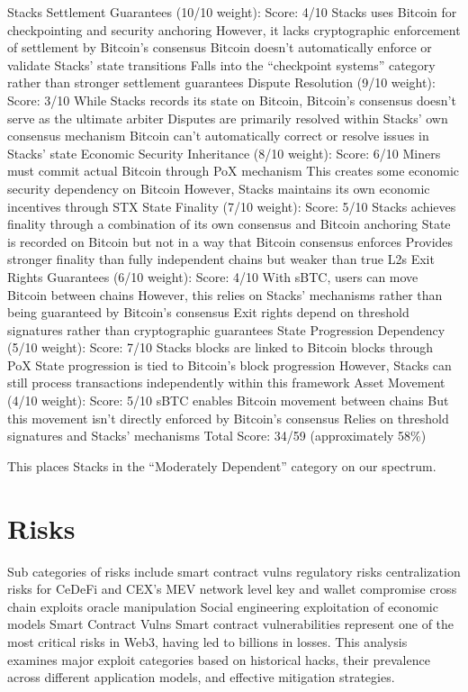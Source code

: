 \documentclass[
  letterpaper,
  DIV=11,
  numbers=noendperiod]{scrreprt}
\begin{document}
Stacks Settlement Guarantees (10/10 weight): Score: 4/10 Stacks uses
Bitcoin for checkpointing and security anchoring However, it lacks
cryptographic enforcement of settlement by Bitcoin's consensus Bitcoin
doesn't automatically enforce or validate Stacks' state transitions
Falls into the ``checkpoint systems'' category rather than stronger
settlement guarantees Dispute Resolution (9/10 weight): Score: 3/10
While Stacks records its state on Bitcoin, Bitcoin's consensus doesn't
serve as the ultimate arbiter Disputes are primarily resolved within
Stacks' own consensus mechanism Bitcoin can't automatically correct or
resolve issues in Stacks' state Economic Security Inheritance (8/10
weight): Score: 6/10 Miners must commit actual Bitcoin through PoX
mechanism This creates some economic security dependency on Bitcoin
However, Stacks maintains its own economic incentives through STX State
Finality (7/10 weight): Score: 5/10 Stacks achieves finality through a
combination of its own consensus and Bitcoin anchoring State is recorded
on Bitcoin but not in a way that Bitcoin consensus enforces Provides
stronger finality than fully independent chains but weaker than true L2s
Exit Rights Guarantees (6/10 weight): Score: 4/10 With sBTC, users can
move Bitcoin between chains However, this relies on Stacks' mechanisms
rather than being guaranteed by Bitcoin's consensus Exit rights depend
on threshold signatures rather than cryptographic guarantees State
Progression Dependency (5/10 weight): Score: 7/10 Stacks blocks are
linked to Bitcoin blocks through PoX State progression is tied to
Bitcoin's block progression However, Stacks can still process
transactions independently within this framework Asset Movement (4/10
weight): Score: 5/10 sBTC enables Bitcoin movement between chains But
this movement isn't directly enforced by Bitcoin's consensus Relies on
threshold signatures and Stacks' mechanisms Total Score: 34/59
(approximately 58\%)

This places Stacks in the ``Moderately Dependent'' category on our
spectrum.

\section{Risks}\label{risks}

Sub categories of risks include smart contract vulns regulatory risks
centralization risks for CeDeFi and CEX's MEV network level key and
wallet compromise cross chain exploits oracle manipulation Social
engineering exploitation of economic models Smart Contract Vulns Smart
contract vulnerabilities represent one of the most critical risks in
Web3, having led to billions in losses. This analysis examines major
exploit categories based on historical hacks, their prevalence across
different application models, and effective mitigation strategies.
\end{document}
